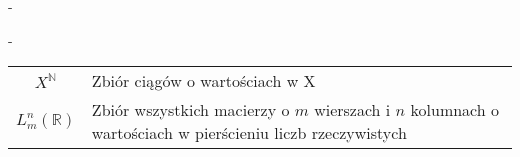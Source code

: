 \documentclass[a4paper,12pt,twoside,polish]{book}
\theoremstyle{definition}
\theoremstyle{plain}
\theoremstyle{definition}
\begin{document}
{\color{white}-}


{\color{white}-}


\begin{tabular}{cp{}}
$X^{\mathbb{N}}$ &  Zbi\'{o}r ciągów o wartościach w X \\
$L_{m}^{n}(\mathbb{R})$ &  Zbi\'{o}r wszystkich macierzy o $m$ wierszach i $n$ kolumnach o warto\'{s}ciach w pierścieniu liczb rzeczywistych \\

\end{tabular}



\newpage
{}
\printindex %
\end{document}
